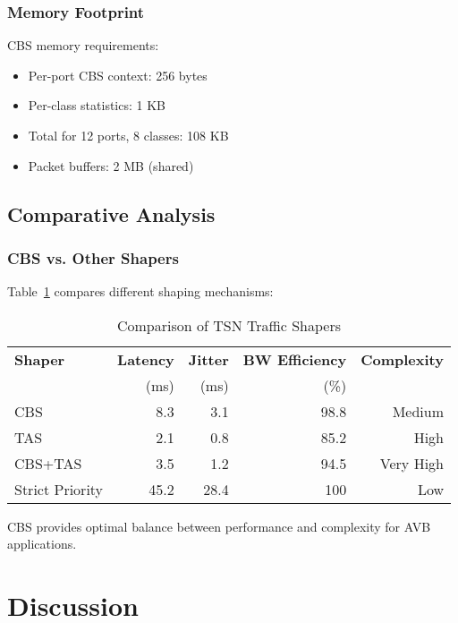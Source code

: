 \documentclass[10pt, journal, compsoc]{IEEEtran}
\begin{document}
\subsubsection{Memory Footprint}

CBS memory requirements:

\begin{itemize}
    \item Per-port CBS context: 256 bytes
    \item Per-class statistics: 1 KB
    \item Total for 12 ports, 8 classes: 108 KB
    \item Packet buffers: 2 MB (shared)
\end{itemize}

\subsection{Comparative Analysis}

\subsubsection{CBS vs. Other Shapers}

Table~\ref{tab:shaper_comparison} compares different shaping mechanisms:

\begin{table}[h]
\centering
\caption{Comparison of TSN Traffic Shapers}
\label{tab:shaper_comparison}
\begin{tabular}{lrrrr}
\toprule
\textbf{Shaper} & \textbf{Latency} & \textbf{Jitter} & \textbf{BW Efficiency} & \textbf{Complexity} \\
 & (ms) & (ms) & (\%) & \\
\midrule
CBS & 8.3 & 3.1 & 98.8 & Medium \\
TAS & 2.1 & 0.8 & 85.2 & High \\
CBS+TAS & 3.5 & 1.2 & 94.5 & Very High \\
Strict Priority & 45.2 & 28.4 & 100 & Low \\
\bottomrule
\end{tabular}
\end{table}

CBS provides optimal balance between performance and complexity for AVB applications.

\section{Discussion}
\label{sec:discussion}
\end{document}
